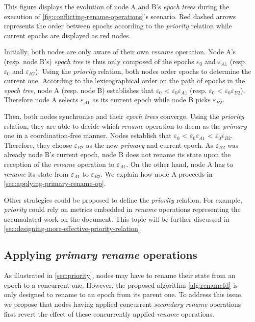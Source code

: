 \documentclass[10pt,journal,compsoc]{IEEEtran}
\newcommand{\epoch}[1]{$\varepsilon_{#1}$}
\begin{document}
This figure displays the evolution of node A and B's \emph{epoch trees} during the execution of \autoref{fig:conflicting-rename-operations}'s scenario.
Red dashed arrows represents the order between epochs according to the \emph{priority} relation while current epochs are displayed as red nodes.

Initially, both nodes are only aware of their own \emph{rename} operation.
Node A's (resp. node B's) \emph{epoch tree} is thus only composed of the epochs \epoch{0} and \epoch{A1} (resp. \epoch{0} and \epoch{B2}).
Using the \emph{priority} relation, both nodes order epochs to determine the current one.
According to the lexicographical order on the path of epochs in the \emph{epoch tree}, node A (resp. node B) establishes that \epoch{0} < \epoch{0}\epoch{A1} (resp. \epoch{0} < \epoch{0}\epoch{B2}).
Therefore node A selects \epoch{A1} as its current epoch while node B picks \epoch{B2}.

Then, both nodes synchronise and their \emph{epoch trees} converge.
Using the \emph{priority} relation, they are able to decide which \emph{rename} operation to deem as the \emph{primary} one in a coordination-free manner.
Nodes establish that \epoch{0} < \epoch{0}\epoch{A1} < \epoch{0}\epoch{B2}.
Therefore, they choose \epoch{B2} as the new \emph{primary} and current epoch.
As \epoch{B2} was already node B's current epoch, node B does not rename its state upon the reception of the \emph{rename} operation to \epoch{A1}.
On the other hand, node A has to \emph{rename} its state from \epoch{A1} to \epoch{B2}.
We explain how node A proceeds in \autoref{sec:applying-primary-rename-op}.

Other strategies could be proposed to define the \emph{priority} relation.
For example, \emph{priority} could rely on metrics embedded in \emph{rename} operations representing the accumulated work on the document.
This topic will be further discussed in \autoref{sec:designing-more-effective-priority-relation}.

\subsection{Applying \emph{primary rename} operations}

\label{sec:applying-primary-rename-op}

As illustrated in \autoref{sec:priority}, nodes may have to rename their state from an epoch to a concurrent one.
However, the proposed algorithm \autoref{alg:renameId} is only designed to rename to an epoch from its parent one.
To address this issue, we propose that nodes having applied concurrent \emph{secondary rename} operations first revert the effect of these concurrently applied \emph{rename} operations.
\end{document}
